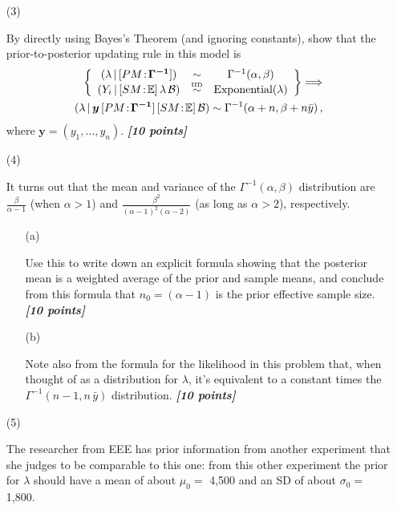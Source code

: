 \documentclass[12pt]{article}
\newcommand{\given}{\, | \,}
\newcommand{\bi}[1]{\b{\i{#1}}}
\renewcommand{\b}[1]{\textbf{#1}}
\renewcommand{\i}[1]{\textit{#1}}
\begin{document}
\begin{itemize}
\begin{itemize}
\item[(3)]

By directly using Bayes's Theorem (and ignoring constants), show that
the prior-to-posterior updating rule in this model is
\begin{eqnarray} \label{e:updating-1}
\left\{ \begin{array}{ccc} ( \lambda \given [ PM \! : \! \bm{ \Gamma^{ -1 } } ] )& \sim & \Gamma^{ -1 } ( \alpha, \beta ) \\ ( Y_i \given [ SM \! : \! \mathbb{ E } ] \, \lambda \, \mathcal{ B } ) & \stackrel{ \mbox{\tiny IID} }{ \sim } & \textrm{Exponential} ( \lambda ) \end{array} \right\} \Longrightarrow \nonumber \\
( \lambda \given \bm{ y } \, [ PM \! : \! \bm{ \Gamma^{ -1 } } ] \, [ SM \! : \! \mathbb{ E } ] \, \mathcal{ B } ) \sim \Gamma^{ -1 } ( \alpha + n, \beta + n \bar{ y } ) \, ,
\end{eqnarray}
where $\bm{ y } = ( y_1, \dots, y_n )$. \bi{[10 points]}

\item[(4)]

It turns out that the mean and variance of the $\Gamma^{ -1 } (
\alpha, \beta )$ distribution are $\frac{ \beta }{ \alpha - 1}$ (when $\alpha > 1$) and $\frac{ \beta^2 }{ ( \alpha - 1 )^2 ( \alpha - 2 ) }$ (as long as
$\alpha > 2$), respectively. 

\begin{itemize}

\item[(a)] 

Use this to write down an explicit formula showing that the posterior mean is a weighted average of the prior and sample means, and conclude from this formula that $n_0 = ( \alpha - 1 )$ is the prior effective sample size. \bi{[10 points]} 

\item[(b)] 

Note also from the formula for the likelihood in this problem that, when thought of as a distribution for $\lambda$, it's equivalent to a constant times the $\Gamma^{ -1 } ( n - 1, n \, \bar{ y } )$ distribution. \bi{[10 points]} 

\end{itemize}

\item[(5)]

The researcher from EEE has prior information from another experiment that she judges to be comparable to this one: from this other experiment the prior for $\lambda$ should have a mean of about $\mu_0 =$ 4,500 and an SD of about $\sigma_0 =$ 1,800.  


\end{itemize}
\end{itemize}
\end{document}
